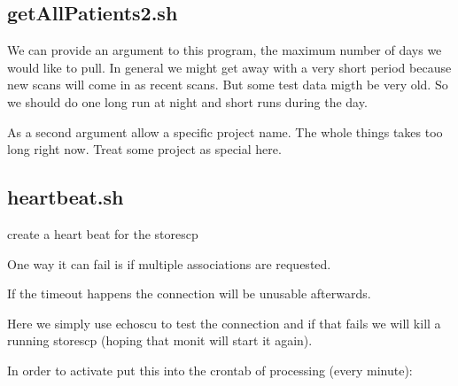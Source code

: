 \documentclass[letterpaper,10pt,english]{sphinxmanual}
\begin{document}
\sphinxAtStartPar
{}

\sphinxAtStartPar
{}

\sphinxAtStartPar
{}

\sphinxAtStartPar
{}

\sphinxAtStartPar
{}

\sphinxstepscope


\subsection{getAllPatients2.sh}
\label{\detokenize{Architecture/scripts/getAllPatients2:getallpatients2-sh}}\label{\detokenize{Architecture/scripts/getAllPatients2::doc}}
\sphinxAtStartPar
We can provide an argument to this program, the maximum number of days we would like to pull. In general we might get away with a very short
period because new scans will come in as recent scans. But some test data migth be very old. So we should do one long run at night and short
runs during the day.

\sphinxAtStartPar
As a second argument allow a specific project name. The whole things takes too long right now. Treat some project as special here.

\sphinxstepscope


\subsection{heartbeat.sh}
\label{\detokenize{Architecture/scripts/heartbeat:heartbeat-sh}}\label{\detokenize{Architecture/scripts/heartbeat::doc}}
\sphinxAtStartPar
create a heart beat for the storescp

\sphinxAtStartPar
One way it can fail is if multiple associations are requested.

\sphinxAtStartPar
If the timeout happens the connection will be unusable afterwards.

\sphinxAtStartPar
Here we simply use echoscu to test the connection and if that fails we will kill a running storescp (hoping that monit will start it again).

\sphinxAtStartPar
In order to activate put this into the crontab of processing (every minute):
\end{document}
